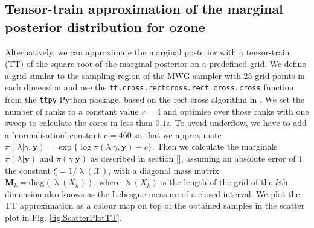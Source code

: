 \subsection{Tensor-train approximation of the marginal posterior distribution for ozone}
\label{sec:firstMargTT}
Alternatively, we can approximate the marginal posterior with a tensor-train (TT) of the square root of the marginal posterior on a predefined grid.
We define a grid similar to the sampling region of the MWG sampler with 25 grid points in each dimension and use the \texttt{tt.cross.rectcross.rect\_cross.cross} function from the \texttt{ttpy} Python package, based on the rect cross algorithm in \cite{}.
We set the number of ranks to a constant value $r = 4$ and optimise over those ranks with one sweep to calculate the cores in less than $0.1$s.
To avoid underflow, we have to add a 'normalisation' constant $c = 460$ so that we approximate $\pi(\lambda | \gamma ,\bm{y}) = \exp\{ \log{\pi(\lambda | \gamma, \bm{y})} + c\}$.
Then we calculate the marginals $\pi(\lambda| \bm{y})$ and $\pi(\gamma| \bm{y})$ as described in section \ref{}, assuming an absolute error of $1$ the constant $\xi = 1/ \uplambda(\mathcal{X}) $, with a diagonal mass matrix $\bm{M}_k=  \text{diag}(\uplambda(X_k))$, where $\uplambda(X_k)$ is the length of the grid of the $k$th dimension also knows as the Lebesgue measure of a closed interval.
We plot the TT approximation as a colour map on top of the obtained samples in the scatter plot in Fig. \ref{fig:ScatterPlotTT}.
